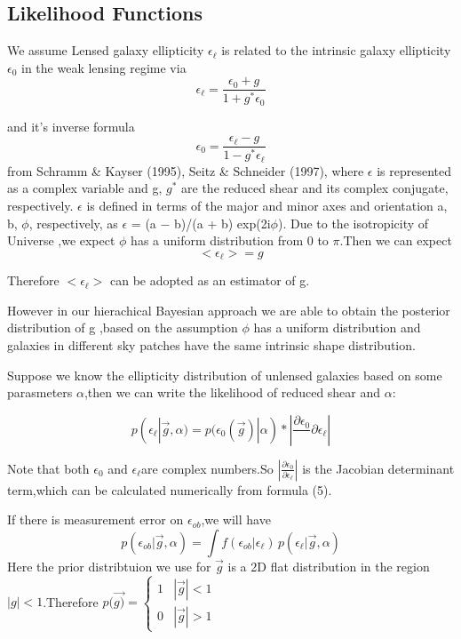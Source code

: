 \documentclass[useAMS,usenatbib]{mn2e}
\begin{document}
\subsection{Likelihood Functions}

We assume Lensed galaxy ellipticity $\epsilon_{\ell}$ is related
to the intrinsic galaxy ellipticity $\epsilon_{0}$ in the weak lensing
regime via
\begin{equation}
\epsilon_{\ell}=\frac{\epsilon_{0}+g}{1+g^{*}\epsilon_{0}}
\end{equation}


and it's inverse formula 
\begin{equation}
\epsilon_{0}=\frac{\epsilon_{\ell}-g}{1-g^{*}\epsilon_{\ell}}
\end{equation}
from Schramm \& Kayser (1995), Seitz \& Schneider (1997), where $\epsilon$
is represented as a complex variable and g, $g^{*}$ are the reduced
shear and its complex conjugate, respectively. $\epsilon$ is defined
in terms of the major and minor axes and orientation a, b, $\phi$,
respectively, as $\epsilon$ = (a − b)/(a + b) exp(2i$\phi$). Due to the isotropicity
of Universe ,we expect $\phi$ has a uniform distribution from 0 to
$\pi$.Then we can expect 
\begin{equation}
<\epsilon_{\ell}>=g
\end{equation}


Therefore $<\epsilon_{\ell}>$ can be adopted as an estimator of g.

However in our hierachical Bayesian approach we are able to obtain
the posterior distribution of g ,based on the assumption  $\phi$ has a uniform distribution and galaxies in different
sky patches have the same intrinsic shape distribution.

Suppose we know the ellipticity distribution of unlensed galaxies
based on some parasmeters $\alpha$,then we can write the likelihood of reduced shear and $\alpha$:

\begin{equation}
p(\epsilon_{\ell}|\vec{g},\alpha)=p(\epsilon_{0}(\vec{g})|\alpha)*|\frac{\partial\epsilon_{0}}\,{\partial\epsilon_{\ell}}|
\end{equation}


Note that both $\epsilon_{0}$ and $\epsilon_{\ell}$are complex numbers.So
$|\frac{\partial\epsilon_{0}}{\partial\epsilon_{\ell}}|$ is the Jacobian
determinant term,which can be calculated numerically from formula
(5).

If there is measurement error on $\epsilon_{ob}$,we will have 
\begin{equation}
p(\epsilon_{ob}|\vec{g},\alpha)=\int f(\epsilon_{ob}|\epsilon_{\ell})\,p(\epsilon_{\ell}|\vec{g},\alpha)
\end{equation}
Here the prior distribtuion we use for $\vec{g}$ is a 2D flat distribution
in the region $|g|<1$.Therefore $p(\vec{g)}=\begin{cases}
1 & |\vec{g}|<1\\
0 & |\vec{g}|>1
\end{cases}$
\end{document}
